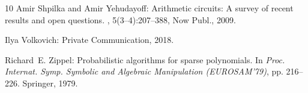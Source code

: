 \documentclass[11pt]{article}
\numberwithin{equation}{section}
\theoremstyle{definition}
\theoremstyle{plain}
\begin{document}
\begin{thebibliography}{10}
{\sc Amir Shpilka and Amir Yehudayoff}: Arithmetic circuits: {A} survey of
  recent results and open questions.
,
  5(3--4):207--388, Now Publ., 2009.
\newblock [\epfmtdoi{10.1561/0400000039}]

{\sc Ilya Volkovich}: Private Communication, 2018.

{\sc Richard~E. Zippel}: Probabilistic algorithms for sparse polynomials.
\newblock In {\em Proc. Internat. Symp. Symbolic and Algebraic Manipulation
  (EUROSAM'79)}, pp. 216--226. Springer, 1979.
\newblock [\epfmtdoi{10.1007/3-540-09519-5\_73}]

\end{thebibliography}
\end{document}
